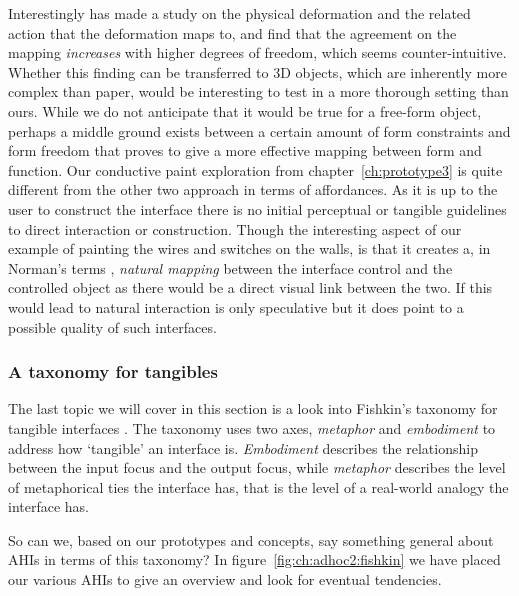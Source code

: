 Interestingly \citet{lee2010users} has made a study on the physical deformation and the related action that the deformation maps to, and find that the agreement on the mapping \emph{increases} with higher degrees of freedom, which seems counter-intuitive.
Whether this finding can be transferred to 3D objects, which are inherently more complex than paper, would be interesting to test in a more thorough setting than ours.
While we do not anticipate that it would be true for a free-form object, perhaps a middle ground exists between a certain amount of form constraints and form freedom that proves to give a more effective mapping between form and function.
\blank
Our conductive paint exploration from chapter~\ref{ch:prototype3} is quite different from the other two approach in terms of affordances.
As it is up to the user to construct the interface there is no initial perceptual or tangible guidelines to direct interaction or construction. Though the interesting aspect of our example of painting the wires and switches on the walls, is that it creates a, in Norman's terms \citep{norman2002design}, \emph{natural mapping} between the interface control and the controlled object as there would be a direct visual link between the two.
If this would lead to natural interaction is only speculative but it does point to a possible quality of such interfaces. 

\subsubsection{A taxonomy for tangibles}
The last topic we will cover in this section is a look into Fishkin's taxonomy for tangible interfaces \citep{fishkin2004taxonomy}.
The taxonomy uses two axes, \emph{metaphor} and \emph{embodiment} to address how `tangible' an interface is.
\emph{Embodiment} describes the relationship between the input focus and the output focus, while \emph{metaphor} describes the level of metaphorical ties the interface has, that is the level of a real-world analogy the interface has.

So can we, based on our prototypes and concepts, say something general about AHIs in terms of this taxonomy?
In figure~\ref{fig:ch:adhoc2:fishkin} we have placed our various AHIs to give an overview and look for eventual tendencies. 

